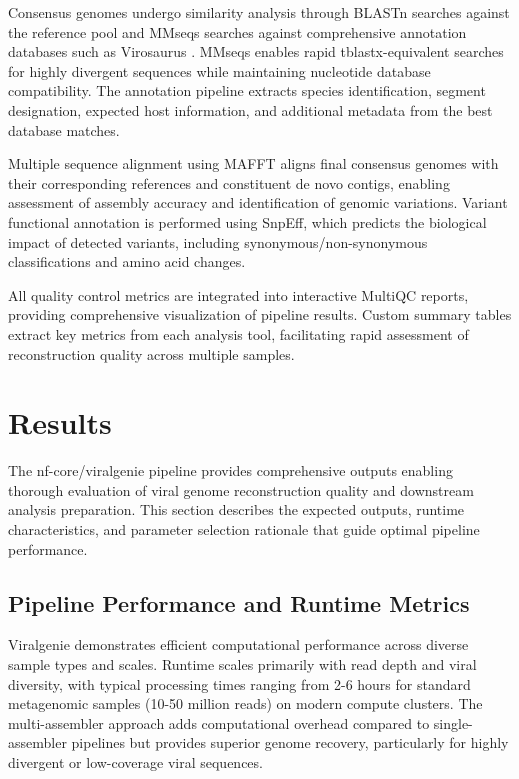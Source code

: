 \documentclass[unnumsec,webpdf,contemporary,large]{oup-authoring-template}%
\theoremstyle{thmstyleone}%
\theoremstyle{thmstyletwo}%
\theoremstyle{thmstylethree}%
\begin{document}
Consensus genomes undergo similarity analysis through BLASTn searches against the reference pool and MMseqs searches against comprehensive annotation databases such as Virosaurus \cite{Gleizes2020-rq}. MMseqs enables rapid tblastx-equivalent searches for highly divergent sequences while maintaining nucleotide database compatibility. The annotation pipeline extracts species identification, segment designation, expected host information, and additional metadata from the best database matches.

Multiple sequence alignment using MAFFT aligns final consensus genomes with their corresponding references and constituent de novo contigs, enabling assessment of assembly accuracy and identification of genomic variations. Variant functional annotation is performed using SnpEff, which predicts the biological impact of detected variants, including synonymous/non-synonymous classifications and amino acid changes.

All quality control metrics are integrated into interactive MultiQC reports, providing comprehensive visualization of pipeline results. Custom summary tables extract key metrics from each analysis tool, facilitating rapid assessment of reconstruction quality across multiple samples.

\section{Results}\label{sec3}

The nf-core/viralgenie pipeline provides comprehensive outputs enabling thorough evaluation of viral genome reconstruction quality and downstream analysis preparation. This section describes the expected outputs, runtime characteristics, and parameter selection rationale that guide optimal pipeline performance.

\subsection{Pipeline Performance and Runtime Metrics}\label{subsec_performance}

Viralgenie demonstrates efficient computational performance across diverse sample types and scales. Runtime scales primarily with read depth and viral diversity, with typical processing times ranging from 2-6 hours for standard metagenomic samples (10-50 million reads) on modern compute clusters. The multi-assembler approach adds computational overhead compared to single-assembler pipelines but provides superior genome recovery, particularly for highly divergent or low-coverage viral sequences.
\end{document}
